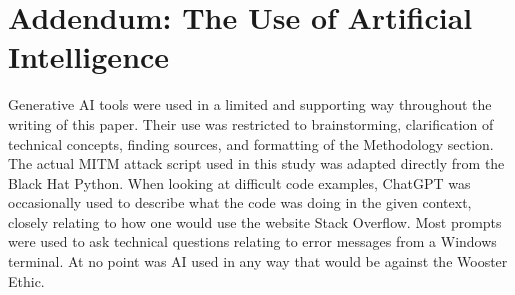 \documentclass[12pt]{article}
\begin{document}
\section{Addendum: The Use of Artificial Intelligence}
Generative AI tools were used in a limited and supporting way throughout the writing of this paper. 
Their use was restricted to brainstorming, clarification of technical concepts, finding sources, and 
formatting of the Methodology section. The actual MITM attack script used in this study was adapted 
directly from the Black Hat Python. 
When looking at difficult code examples, ChatGPT was occasionally used to describe what the code was 
doing in the given context, closely relating to how one would use the website Stack Overflow. Most 
prompts were used to ask technical questions relating to error messages from a Windows terminal. At 
no point was AI used in any way that would be against the Wooster Ethic.




\end{document}
